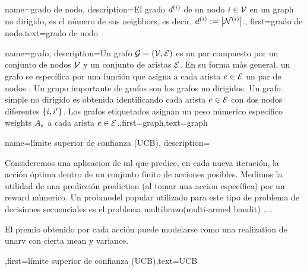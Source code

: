 {{%
{name={grado de nodo},
	description={El grado $d^{(i)}$ de un nodo $i \in \mathcal{V}$ 
		en un \gls{graph} no dirigido, es el número de sus \gls{neighbors}, es decir, $d^{(i)} := \big|\mathcal{N}^{(i)}\big|$.},
		first={grado de nodo},text={grado de nodo} 
}

{name={grafo},
	description={Un grafo $\mathcal{G} = \left( \mathcal{V},\mathcal{E} \right)$ es un par compuesto por un  
		conjunto de nodos $\mathcal{V}$ y un conjunto de aristas $\mathcal{E}$. En su forma màs general, un grafo se 
		específica por una función que asigna a cada arista $e \in \mathcal{E}$ un par de nodos \cite{RockNetworks}. 
		Un grupo importante de grafos son los grafos no dirigidos. Un grafo simple no dirigido  
		es obtenida identificando cada arista $e \in \mathcal{E}$ con dos nodos diferentes $\{i,i'\}$. 
		Los grafos etiquetados asignan un peso númerico especifico \gls{weights} $A_{e}$ a cada 
		arista $e \in \mathcal{E}$.},first={graph},text={graph} 
}


{name={límite superior de confianza (UCB)},
	description={Consideremos una aplicacion de \gls{ml} 
		 que predice, en cada nueva iteración,
		 la acción óptima dentro de un conjunto finito de acciones posibles. Medimos la utilidad  
		 de una predicción \gls{prediction} (al tomar una accion específica) por un \gls{reward} númerico. 
		 Un \gls{probmodel} popular utilizado para este tipo de problema de decisiones secuenciales
		 es el problema multibrazo(multi-armed bandit) $\ldots$. 
		 
		 El premio obtenido por cada acción puede modelarse como una \gls{realization} de una\gls{rv} 
		 con cierta \gls{mean} y \gls{variance}.},first={límite superior de confianza (UCB)},text={UCB} 
}


}}
